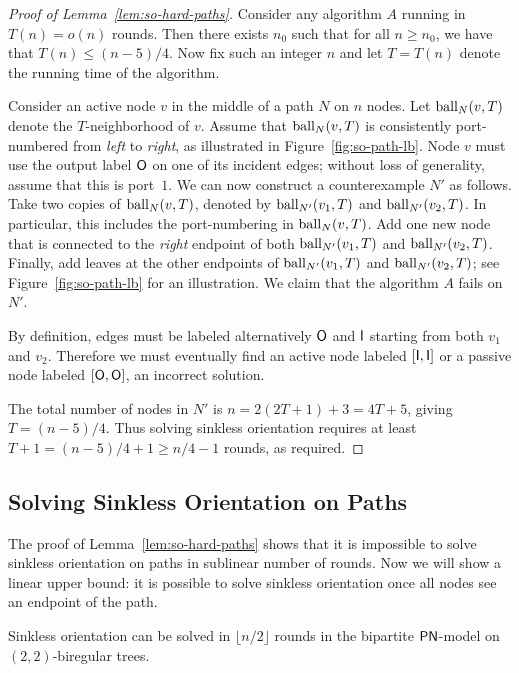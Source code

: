 \begin{proof}[Proof of Lemma~\ref{lem:so-hard-paths}]
	Consider any algorithm $A$ running in $T(n) = o(n)$ rounds. Then there exists $n_0$ such that for all $n \geq n_0$, we have that $T(n) \leq (n-5)/4$. Now fix such an integer $n$ and let $T = T(n)$ denote the running time of the algorithm.
	
	Consider an active node $v$ in the middle of a path $N$ on $n$ nodes. Let $\operatorname{ball}_N(v,T)$ denote the $T$-neighborhood of $v$. Assume that $\operatorname{ball}_N(v,T)$ is consistently port-numbered from \emph{left} to \emph{right}, as illustrated in Figure~\ref{fig:so-path-lb}. Node $v$ must use the output label $\mathsf{O}$ on one of its incident edges; without loss of generality, assume that this is port~$1$. We can now construct a counterexample $N'$ as follows. Take two copies of $\operatorname{ball}_N(v,T)$, denoted by $\operatorname{ball}_{N'}(v_1,T)$ and $\operatorname{ball}_{N'}(v_2,T)$. In particular, this includes the port-numbering in $\operatorname{ball}_N(v,T)$.
	Add one new node that is connected to the \emph{right} endpoint of both $\operatorname{ball}_{N'}(v_1,T)$ and $\operatorname{ball}_{N'}(v_2,T)$. Finally, add leaves at the other endpoints of $\operatorname{ball}_{N'}(v_1,T)$ and $\operatorname{ball}_{N'}(v_2,T)$; see Figure~\ref{fig:so-path-lb} for an illustration. We claim that the algorithm $A$ fails on $N'$.
	
	By definition, edges must be labeled alternatively $\mathsf{O}$ and $\mathsf{I}$ starting from both $v_1$ and $v_2$. Therefore we must eventually find an active node labeled $[\mathsf{I}, \mathsf{I}]$ or a passive node labeled $[\mathsf{O}, \mathsf{O}]$, an incorrect solution.
	
	The total number of nodes in $N'$ is $n = 2(2T+1)+3 = 4T + 5$, giving $T = (n-5)/4$. Thus solving sinkless orientation requires at least $T+1 = (n-5)/4 + 1 \geq n/4 - 1$ rounds, as required. 
\end{proof}

\subsection{Solving Sinkless Orientation on Paths} \label{ssec:so-alg-path}

The proof of Lemma~\ref{lem:so-hard-paths} shows that it is impossible to solve sinkless orientation on paths in sublinear number of rounds. Now we will show a linear upper bound: it is possible to solve sinkless orientation once all nodes see an endpoint of the path.

\begin{lemma}\label{lem:so-path-ub}
	Sinkless orientation can be solved in $\lfloor n/2 \rfloor$ rounds in the bipartite $\textup{\sffamily PN}$-model on $(2,2)$-biregular trees. 
\end{lemma}

